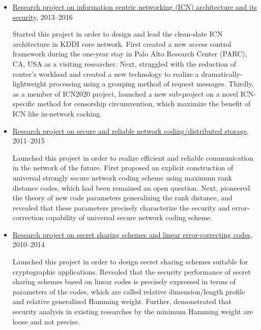 \begin{itemize}
  \item \hspace*{4ex}
    \underline{Research project on information centric networking (ICN) architecture and its security},
    2013--2016\\[0.5ex]
    \hspace*{6ex}
    \begin{minipage}{0.9\linewidth}
      Started this project in order to design and lead the clean-slate ICN architecture in KDDI core network.
      First created a new access control framework during the one-year stay in Palo Alto Research Center (PARC), CA, USA as a visiting researcher. Next, struggled with the reduction of router's workload and created a new technology to realize a dramatically-lightweight processing using a grouping method of request messages. Thirdly, as a member of ICN2020 project, launched a new sub-project on a novel ICN-specific method for censorship circumvention, which maximize the benefit of ICN like in-network caching.
    \end{minipage}

  \item \hspace*{4ex}
    \underline{Research project on secure and reliable network coding/distributed storage},
    2011--2015\\[0.5ex]
    \hspace*{6ex}
    \begin{minipage}{0.9\linewidth}
      Launched this project in order to realize efficient and reliable communication
      in the network of the future.
      First proposed an explicit construction of
      universal strongly secure network coding scheme using maximum rank
      distance codes, which had been remained an open question.
      Next, pioneered the theory of new code parameters generalizing the rank distance, and revealed
      that these parameters precisely characterize the security and
      error-correction capability of universal secure network coding
      scheme.
    \end{minipage}

  \item \hspace*{4ex}
    \underline{Research project on secret sharing schemes and linear error-correcting codes},
    2010--2014\\[0.5ex]
    \hspace*{6ex}
    \begin{minipage}{0.9\linewidth}
      Launched this project in order to design secret sharing schemes suitable
      for cryptographic applications.
      Revealed that the security performance of secret sharing schemes based
      on linear codes is precisely expressed in terms of parameters of
      the codes, which are called relative dimension/length profile and
      relative generalized Hamming weight. Further, demonstrated that security analysis in existing
      researches by the minimum Hamming weight are loose and not precise.
    \end{minipage}


\end{itemize}
